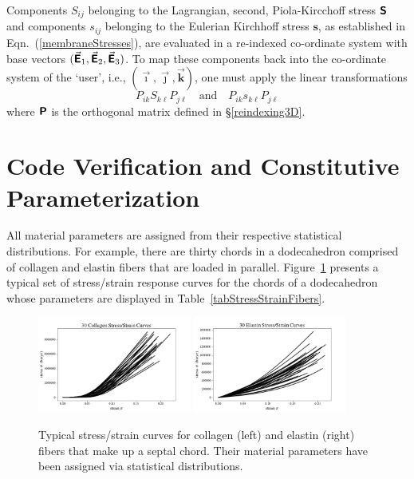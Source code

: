 Components $S_{ij}$ belonging to the Lagrangian, second, Piola-Kircchoff stress $\boldsymbol{\mathsf{S}}$ and components $s_{ij}$ belonging to the Eulerian Kirchhoff stress $\boldsymbol{s}$, as established in Eqn.~(\ref{membraneStresses}), are evaluated in a re-indexed co-ordinate system with base vectors $( \vec{\boldsymbol{\mathsf{E}}}_1 , \vec{\boldsymbol{\mathsf{E}}}_2 , \vec{\boldsymbol{\mathsf{E}}}_3 )$.  To map these components back into the co-ordinate system of the `user', i.e., $( \vec{\boldsymbol{\imath}} , \vec{\boldsymbol{\jmath}} , \vec{\boldsymbol{k}} )$, one must apply the linear transformations
\begin{displaymath}
P_{ik} S_{k\ell} P_{j\ell}
\quad \text{and} \quad
P_{ik} s_{k\ell} P_{j\ell} 
\end{displaymath}
where $\boldsymbol{\mathsf{P}}$ is the orthogonal matrix defined in \S\ref{reindexing3D}.

\section{Code Verification and Constitutive Parameterization}
\label{secCE_verifyCode}

All material parameters are assigned from their respective statistical distributions.  For example, there are thirty chords in a dodecahedron comprised of collagen and elastin fibers that are loaded in parallel.  Figure~\ref{figStressStrainFibers} presents a typical set of stress\slash strain response curves for the chords of a dodecahedron whose parameters are displayed in Table~\ref{tabStressStrainFibers}.

\begin{figure}
    \centering
    \includegraphics[width=0.45\textwidth]{figures/collagenStressStrain.jpg}
    \includegraphics[width=0.45\textwidth]{figures/elastinStressStrain.jpg}
    \caption{Typical stress\slash strain curves for collagen (left) and elastin (right) fibers that make up a septal chord.  Their material parameters have been assigned via statistical distributions.}
    \label{figStressStrainFibers}
\end{figure}


